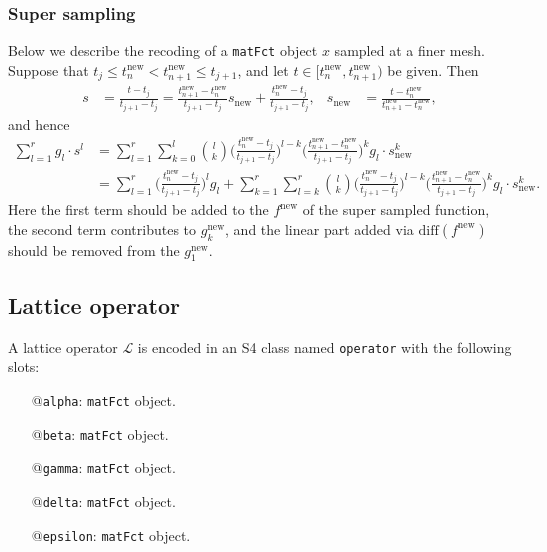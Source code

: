 \documentclass[12pt,a4paper]{article}
\newcommand{\Lop}{\mathcal{L}}
\begin{document}
\subsubsection{Super sampling}

Below we describe the recoding of a \texttt{matFct} object $x$ sampled at a finer mesh. Suppose that $t_j \le t^\text{new}_n < t^\text{new}_{n+1} \le t_{j+1}$, and let $t \in [t^\text{new}_n, t^\text{new}_{n+1})$ be given. Then
\begin{align*}
s &= \frac{t-t_j}{t_{j+1}-t_j} = \frac{t^\text{new}_{n+1}-t^\text{new}_n}{t_{j+1}-t_j} s_\text{new} + \frac{t^\text{new}_n-t_j}{t_{j+1}-t_j}, &
s_\text{new} &= \frac{t-t^\text{new}_n}{t^\text{new}_{n+1}-t^\text{new}_n},
\end{align*}
and hence
\begin{align*}
\sum_{l=1}^r g_l \cdot s^l &= \sum_{l=1}^r \sum_{k=0}^l {l \choose k} \bigg( \frac{t^\text{new}_n-t_j}{t_{j+1}-t_j} \bigg)^{l-k} \bigg(\frac{t^\text{new}_{n+1}-t^\text{new}_n}{t_{j+1}-t_j}\bigg)^k g_l \cdot s_\text{new}^k \\
&= \sum_{l=1}^r \bigg( \frac{t^\text{new}_n-t_j}{t_{j+1}-t_j} \bigg)^l g_l +
\sum_{k=1}^r \sum_{l=k}^r {l \choose k} \bigg( \frac{t^\text{new}_n-t_j}{t_{j+1}-t_j} \bigg)^{l-k} \bigg(\frac{t^\text{new}_{n+1}-t^\text{new}_n}{t_{j+1}-t_j}\bigg)^k g_l \cdot s_\text{new}^k.
\end{align*}
Here the first term should be added to the $f^\text{new}$ of the super sampled function, the second term contributes to $g^\text{new}_k$, and the linear part added via $\mathrm{diff}(f^\text{new})$ should be removed from the $g^\text{new}_1$.

\subsection{Lattice operator}

A lattice operator $\Lop$ is encoded in an S4 class named \texttt{operator} with the following slots: 
\begin{itemize}
\item[@\texttt{alpha}:] \texttt{matFct} object.
\item[@\texttt{beta}:] \texttt{matFct} object.
\item[@\texttt{gamma}:] \texttt{matFct} object.
\item[@\texttt{delta}:] \texttt{matFct} object.
\item[@\texttt{epsilon}:] \texttt{matFct} object.
\end{itemize}
\end{document}

